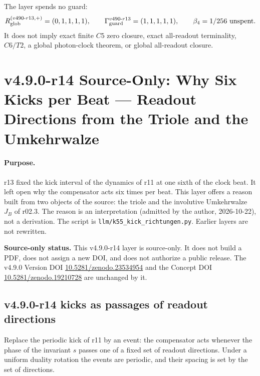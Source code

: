 The layer spends no guard:
\[
R_{\rm glob}^{(v490\text{-}r13,+)}=(0,1,1,1,1),
\qquad
\Gamma_{\rm guard}^{v490\text{-}r13}=(1,1,1,1,1),
\qquad
\beta_4=1/256\ \text{unspent}.
\]
It does not imply exact finite \(C5\) zero closure, exact all-readout terminality,
\(C6/T2\), a global photon-clock theorem, or global all-readout closure.

\clearpage
\section*{v4.9.0-r14 Source-Only: Why Six Kicks per Beat --- Readout Directions from the Triole and the Umkehrwalze}
\label{sec:v490-r14-readout-directions}

\paragraph{Purpose.}
r13 fixed the kick interval of the dynamics of r11 at one sixth of the clock beat.  It left open why the compensator acts
six times per beat.  This layer offers a reason built from two objects of the source: the triole and the involutive
Umkehrwalze \(J_B\) of r02.3.  The reason is an interpretation (admitted by the author, 2026-10-22), not a derivation.  The
script is \texttt{llm/k55\_kick\_richtungen.py}.  Earlier layers are not rewritten.

\noindent\textbf{Source-only status.}
This v4.9.0-r14 layer is source-only.  It does not build a PDF, does not assign a new DOI,
and does not authorize a public release.  The v4.9.0 Version DOI
\href{https://doi.org/10.5281/zenodo.23534954}{10.5281/zenodo.23534954} and the Concept DOI
\href{https://doi.org/10.5281/zenodo.19210728}{10.5281/zenodo.19210728} are unchanged by it.

\subsection*{v4.9.0-r14 kicks as passages of readout directions}
\label{subsec:v490-r14-passages}

Replace the periodic kick of r11 by an event: the compensator acts whenever the phase of the invariant \(s\) passes one of a
fixed set of readout directions.  Under a uniform duality rotation the events are periodic, and their spacing is set by the
set of directions.

